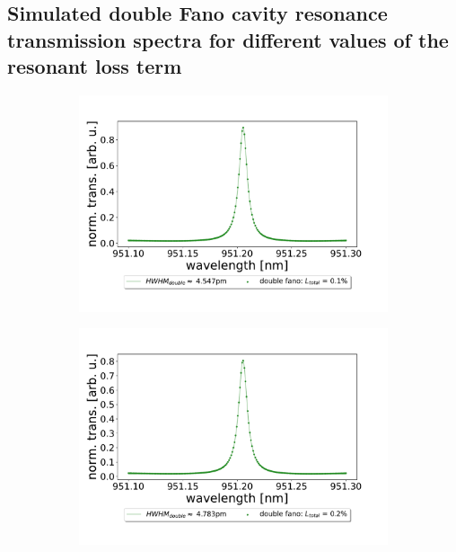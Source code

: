 \newpage
\subsection{Simulated double Fano cavity resonance transmission spectra for different values of the resonant loss term}

\begin{figure}[h!]
    \centering
    \begin{subfigure}[b]{0.49\textwidth}
        \includegraphics[width=\textwidth]{figures/double_01_percent_loss_30um.pdf}
        \caption{}
        \label{fig:0.1_percent_loss}
    \end{subfigure}
    \begin{subfigure}[b]{0.49\textwidth}
        \includegraphics[width=\textwidth]{figures/double_02_percent_loss_30um.pdf}
        \caption{}

\end{subfigure}
\end{figure}
